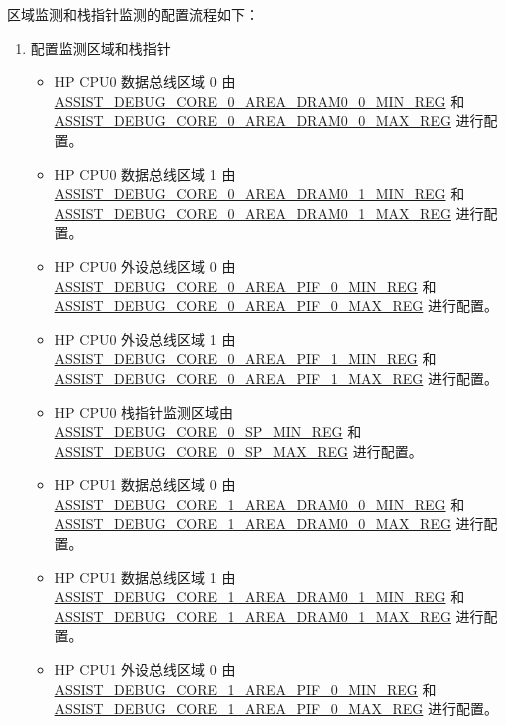 \documentclass[main\_\_CN.tex]{subfiles}
\begin{document}
区域监测和栈指针监测的配置流程如下：
\begin{enumerate}
    \item 配置监测区域和栈指针
        \begin{itemize}
            \item HP CPU0 数据总线区域 0 由 \hyperref[regdesc:ASSISTDEBUGCORE0AREADRAM00MINREG]{ASSIST\_DEBUG\_CORE\_0\_AREA\_DRAM0\_0\_MIN\_REG} 和\\ \hyperref[regdesc:ASSISTDEBUGCORE0AREADRAM00MAXREG]{ASSIST\_DEBUG\_CORE\_0\_AREA\_DRAM0\_0\_MAX\_REG} 进行配置。
            \item HP CPU0 数据总线区域 1 由 \hyperref[regdesc:ASSISTDEBUGCORE0AREADRAM01MINREG]{ASSIST\_DEBUG\_CORE\_0\_AREA\_DRAM0\_1\_MIN\_REG} 和\\ \hyperref[regdesc:ASSISTDEBUGCORE0AREADRAM01MAXREG]{ASSIST\_DEBUG\_CORE\_0\_AREA\_DRAM0\_1\_MAX\_REG} 进行配置。
            \item HP CPU0 外设总线区域 0 由 \hyperref[regdesc:ASSISTDEBUGCORE0AREAPIF0MINREG]{ASSIST\_DEBUG\_CORE\_0\_AREA\_PIF\_0\_MIN\_REG} 和\\ \hyperref[regdesc:ASSISTDEBUGCORE0AREAPIF0MAXREG]{ASSIST\_DEBUG\_CORE\_0\_AREA\_PIF\_0\_MAX\_REG} 进行配置。
            \item HP CPU0 外设总线区域 1 由 \hyperref[regdesc:ASSISTDEBUGCORE0AREAPIF1MINREG]{ASSIST\_DEBUG\_CORE\_0\_AREA\_PIF\_1\_MIN\_REG} 和\\ \hyperref[regdesc:ASSISTDEBUGCORE0AREAPIF1MAXREG]{ASSIST\_DEBUG\_CORE\_0\_AREA\_PIF\_1\_MAX\_REG} 进行配置。
            \item HP CPU0 栈指针监测区域由 \hyperref[regdesc:ASSISTDEBUGCORE0SPMINREG]{ASSIST\_DEBUG\_CORE\_0\_SP\_MIN\_REG} 和\\ \hyperref[regdesc:ASSISTDEBUGCORE0SPMAXREG]{ASSIST\_DEBUG\_CORE\_0\_SP\_MAX\_REG} 进行配置。
            \item HP CPU1 数据总线区域 0 由 \hyperref[regdesc:ASSISTDEBUGCORE1AREADRAM00MINREG]{ASSIST\_DEBUG\_CORE\_1\_AREA\_DRAM0\_0\_MIN\_REG} 和\\ \hyperref[regdesc:ASSISTDEBUGCORE1AREADRAM00MAXREG]{ASSIST\_DEBUG\_CORE\_1\_AREA\_DRAM0\_0\_MAX\_REG} 进行配置。
            \item HP CPU1 数据总线区域 1 由 \hyperref[regdesc:ASSISTDEBUGCORE1AREADRAM01MINREG]{ASSIST\_DEBUG\_CORE\_1\_AREA\_DRAM0\_1\_MIN\_REG} 和\\ \hyperref[regdesc:ASSISTDEBUGCORE1AREADRAM01MAXREG]{ASSIST\_DEBUG\_CORE\_1\_AREA\_DRAM0\_1\_MAX\_REG} 进行配置。
            \item HP CPU1 外设总线区域 0 由 \hyperref[regdesc:ASSISTDEBUGCORE1AREAPIF0MINREG]{ASSIST\_DEBUG\_CORE\_1\_AREA\_PIF\_0\_MIN\_REG} 和\\ \hyperref[regdesc:ASSISTDEBUGCORE1AREAPIF0MAXREG]{ASSIST\_DEBUG\_CORE\_1\_AREA\_PIF\_0\_MAX\_REG} 进行配置。

\end{itemize}
\end{enumerate}
\end{document}

